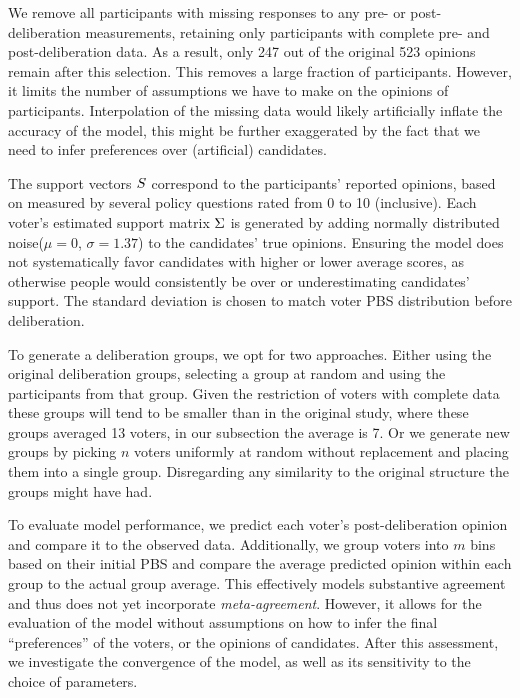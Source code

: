 \documentclass[11pt, oneside, dvipsnames]{Thesis} %
\begin{document}
We remove all participants with missing responses to any pre- or
post-deliberation measurements, retaining only participants with complete pre-
and post-deliberation data. As a result, only 247 out of the original 523
opinions remain after this selection. This removes a large fraction of
participants. However, it limits the number of assumptions we have to make on
the opinions of participants.  Interpolation of the missing data would likely
artificially inflate the accuracy of the model, this might be further
exaggerated by the fact that we need to infer preferences over (artificial)
candidates.

The support vectors $S$ correspond to the participants'
reported opinions, based on measured by several policy questions rated from 0
to 10 (inclusive). Each voter's estimated support matrix $\Sigma$ is
generated by adding normally distributed noise($\mu=0$, $\sigma=1.37$) to the
candidates' true opinions. Ensuring the model does not systematically favor
candidates with higher or lower average scores, as otherwise people would
consistently be over or underestimating candidates' support. The standard
deviation is chosen to match voter PBS distribution before deliberation.


To generate a deliberation groups, we opt for two approaches. Either using the
original deliberation groups, selecting a group at random and using the participants
from that group. Given the restriction of voters with complete data these
groups will tend to be smaller than in the original study, where these groups
averaged 13 voters, in our subsection the average is 7. Or we generate new
groups by picking $n$ voters uniformly at random without replacement and
placing them into a single group. Disregarding any similarity to the original
structure the groups might have had.

To evaluate model performance, we predict each voter's post-deliberation
opinion and compare it to the observed data. Additionally, we group voters into
$m$ bins based on their initial PBS and compare the average predicted opinion
within each group to the actual group average. This effectively models
substantive agreement and thus does not yet incorporate \textit{meta-agreement}.
However, it allows for the evaluation of the model without assumptions on how
to infer the final ``preferences'' of the voters, or the opinions of
candidates. After this assessment, we investigate the convergence of the model,
as well as its sensitivity to the choice of parameters.
\end{document}
